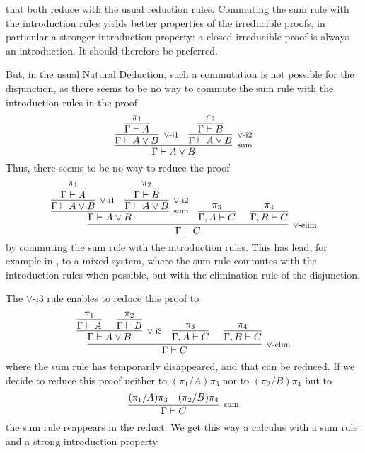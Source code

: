 \documentclass[screen, sigconf,authorversion,nonacm]{acmart}
\theoremstyle{acmdefinition}
\numberwithin{equation}{section}
\newcommand\irule[3]{\infer[\mbox{\footnotesize $#3$}]{#2}{#1}}
\begin{document}
that both reduce with the usual reduction rules.  Commuting the sum
rule with the introduction rules yields better properties of the
irreducible proofs, in particular a stronger introduction property: a
closed irreducible proof is always an introduction. It should
therefore be preferred.

But, in the usual Natural Deduction, such a commutation is not
possible for the disjunction, as there seems to be no way to commute
the sum rule with the introduction rules in the proof
$$\irule{\irule{\irule{\pi_1}
                      {\Gamma \vdash A}
                      {}
                }
                {\Gamma \vdash A \vee B}
                {\mbox{$\vee$-i1}}
        &\irule{\irule{\pi_2}
                      {\Gamma \vdash B}
                      {}
               }
               {\Gamma \vdash A \vee B}
               {\mbox{$\vee$-i2}}
        }
        {\Gamma \vdash A \vee B}
        {\mbox{sum}}$$
Thus, there seems to be no way to reduce the proof 
$$\irule{\irule{\irule{\irule{\pi_1}
                             {\Gamma \vdash A}
                             {}
                       }
                       {\Gamma \vdash A \vee B}
                       {\mbox{$\vee$-i1}}
               &\irule{\irule{\pi_2}
                             {\Gamma \vdash B}
                             {}
                      }
                      {\Gamma \vdash A \vee B}
                      {\mbox{$\vee$-i2}}
               }
               {\Gamma \vdash A \vee B}
               {\mbox{sum}}
        &\irule{\pi_3}{\Gamma, A \vdash C}{}
        &\irule{\pi_4}{\Gamma, B \vdash C}{}
        }
        {\Gamma \vdash C}
        {\mbox{$\vee$-elim}}$$
by commuting the sum rule with the introduction rules.  This has lead,
for example in \cite{DiazcaroDowekTCS23}, to a mixed system, where the
sum rule commutes with the introduction rules when possible, but with
the elimination rule of the disjunction.

The $\vee$-i3 rule enables to reduce this proof to 
$$\irule{\irule{\irule{\pi_1}
                      {\Gamma \vdash A}
                      {}
               &\irule{\pi_2}
                      {\Gamma \vdash B}
                      {}
               }
               {\Gamma \vdash A \vee B}
               {\mbox{$\vee$-i3}}
        &\irule{\pi_3}{\Gamma, A \vdash C}{}
        &\irule{\pi_4}{\Gamma, B \vdash C}{}
        }
        {\Gamma \vdash C}
        {\mbox{$\vee$-elim}}$$
where the sum rule has temporarily disappeared, and that can be
reduced.  If we decide to reduce this proof neither to
$(\pi_1/A)\pi_3$ nor to $(\pi_2/B)\pi_4$ but to
$$\irule{(\pi_1/A)\pi_3 & (\pi_2/B)\pi_4}
        {\Gamma \vdash C}
        {\mbox{sum}}$$
the sum rule reappears in the reduct. We get this way a calculus with a
sum rule and a strong introduction property.
\end{document}
